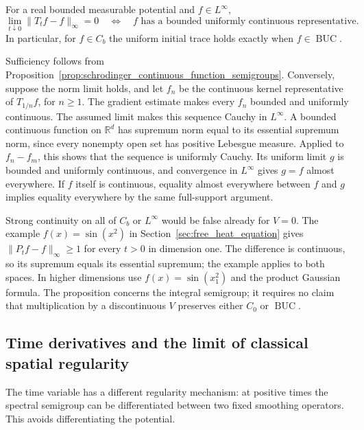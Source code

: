 \begin{corollary}
\label{cor:schrodinger_maximal_uniform_trace}
For a real bounded measurable potential and $f\in L^\infty$,
\[
\lim_{t\downarrow0}\|T_tf-f\|_\infty=0
\quad\Longleftrightarrow\quad
f\text{ has a bounded uniformly continuous representative}.
\]
In particular, for $f\in C_b$ the uniform initial trace holds exactly
when $f\in\operatorname{BUC}$.
\end{corollary}
\Proof
Sufficiency follows from
Proposition~\ref{prop:schrodinger_continuous_function_semigroups}.
Conversely, suppose the norm limit holds, and let $f_n$ be the
continuous kernel representative of $T_{1/n}f$, for $n\geq1$. The gradient estimate
makes every $f_n$ bounded and uniformly continuous. The assumed limit
makes this sequence Cauchy in $L^\infty$. A bounded continuous function on
$\mathbb R^d$ has supremum norm equal to its essential supremum norm, since
every nonempty open set has positive Lebesgue measure. Applied to
$f_n-f_m$, this shows that the sequence is uniformly Cauchy. Its
uniform limit $g$ is bounded and uniformly continuous, and convergence
in $L^\infty$ gives $g=f$ almost everywhere. If $f$ itself is
continuous, equality almost everywhere between $f$ and $g$ implies
equality everywhere by the same full-support argument.
\Done

Strong continuity on all of $C_b$ or $L^\infty$ would be false already
for $V=0$. The example $f(x)=\sin(x^2)$ in
Section~\ref{sec:free_heat_equation} gives
$\|P_tf-f\|_\infty\geq1$ for every $t>0$ in dimension one.
The difference is continuous, so its supremum equals its essential
supremum; the example applies to both spaces. In higher dimensions use
$f(x)=\sin(x_1^2)$ and the product Gaussian formula.
The proposition concerns the integral semigroup; it requires no claim
that multiplication by a discontinuous $V$ preserves either $C_0$ or
$\operatorname{BUC}$.

\subsection{Time derivatives and the limit of classical spatial regularity}
The time variable has a different regularity mechanism: at positive
times the spectral semigroup can be differentiated between two fixed
smoothing operators. This avoids differentiating the potential.

